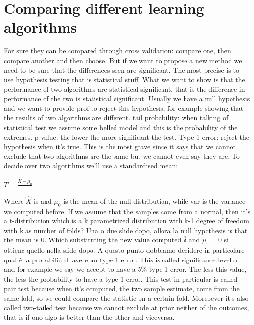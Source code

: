 \section{Comparing different learning algorithms}
For sure they can be compared through cross validation: compare one, then compare another and then choose. But if we want to propose a new method we need to be sure that the differences seen are significant. The most precise is to use hypothesis testing that is statistical stuff.\newline
What we want to show is that the performance of two algorithms are statistical significant, that is the difference in performance of the two is statistical significant. \newline
Usually we have a null hypothesis and we want to provide prof to reject this hypothesis, for example showing that the results of two algorithms are different. \newline
tail probability: when talking of statistical test we assume some belled model and this is the probability of the extremes. \newline
p-value: the lower the more significant the test.\newline
Type 1 error: reject the hypothesis when it's true. This is the most grave since it says that we cannot exclude that two algorithms are the same but we cannot even say they are.\newline
To decide over two algorithms we'll use a standardised mean:
\begin{center}
	$\displaystyle T=\frac{\widehat{X}-\mu_0}{}$
\end{center}
Where $\widehat{X}$ is and $\mu_0$ is the mean of the null distribution, while var is the variance we computed before. \newline
If we assume that the samples come from a normal, then it's a t-distribution which is a k parametrized distribution with k-1 degree of freedom with k as number of folds?\newline
Una o due slide dopo, allora la null hypothesis is that the mean is 0. Which substituting the new value computed $\widehat{\delta}$ and $\mu_0=0$ si ottiene quello nella slide dopo. A questo punto dobbiamo decidere in particolare qual è la probabilià di avere un type 1 error. This is called significance level $\alpha$ and for example we say we accept to have a $5\%$ type 1 error. The less this value, the less the probability to have a type 1 error.\newline
This test in particular is called pair test because when it's computed, the two sample estimate, come from the same fold, so we could compare the statistic on a certain fold. Moreoever it's also called two-tailed test because we cannot exclude at prior neither of the outcomes, that is if ono algo is better than the other and viceversa. 
